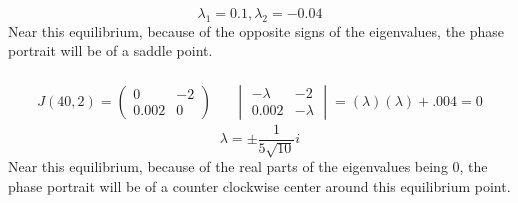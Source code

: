 \documentclass[12pt]{article}
\begin{document}
$$\lambda_1 = 0.1, \lambda_2 = -0.04$$
Near this equilibrium, because of the opposite signs of the eigenvalues, the phase portrait will be of a saddle point. 
\\ \\
	\begin{align*}
	J(40,2) = 
	\begin{pmatrix}
		0 & -2 \\
		0.002 & 0
	\end{pmatrix} &&
	\begin{vmatrix}
		- \lambda & -2 \\
		0.002 & - \lambda 
	\end{vmatrix} = (\lambda)(\lambda) + .004 = 0
	\end{align*}
$$ \lambda = \pm \frac{1}{5\sqrt{10}}i $$
Near this equilibrium, because of the real parts of the eigenvalues being 0, the phase portrait will be of a counter clockwise center around this equilibrium point.
\end{document}
